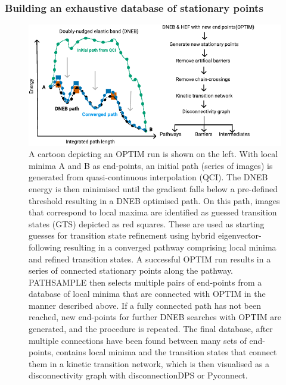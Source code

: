 \documentclass[journal=jacsat]{achemso}
\begin{document}
\subsubsection{Building an exhaustive database of stationary points}
\begin{figure}
    \centering
    \includegraphics{Fig1.pdf}
    \caption{A cartoon depicting an OPTIM run is shown on the left. With local minima A and B as end-points, an initial path (series of images) is generated from quasi-continuous interpolation (QCI). The DNEB energy is then minimised until the gradient falls below a pre-defined threshold resulting in a DNEB optimised path. On this path, images that correspond to local maxima are identified as guessed transition states (GTS) depicted as red squares. These are used as starting guesses for transition state refinement using hybrid eigenvector-following resulting in a converged pathway comprising local minima and refined transition states. A successful OPTIM run results in a series of connected stationary points along the pathway. PATHSAMPLE then selects multiple pairs of end-points from a database of local minima that are connected with OPTIM in the manner described above. If a fully connected path has not been reached, new end-points for further DNEB searches with OPTIM are generated, and the procedure is repeated. The final database, after multiple connections have been found between many sets of end-points, contains local minima and the transition states that connect them in a kinetic transition network, which is then visualised as a disconnectivity graph with disconnectionDPS or Pyconnect\cite{Smeeton14a}. }
    \label{fig:flow}
\end{figure}
\end{document}
